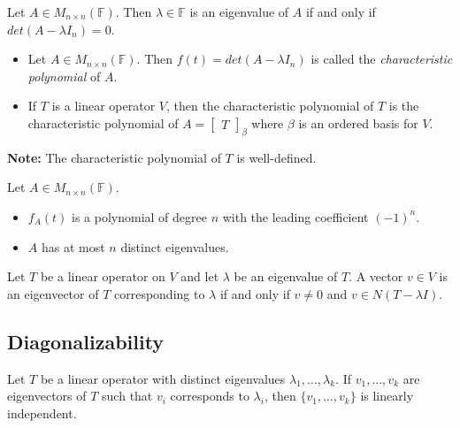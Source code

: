 \documentclass[12pt]{article}
\newenvironment{theorem}[2][Theorem]{\begin{trivlist}
\item[\hskip \labelsep {\bfseries #1}\hskip \labelsep {\bfseries #2.}]}{\end{trivlist}}
\newenvironment{definition}[2][Definition]{\begin{trivlist}
\item[\hskip \labelsep {\bfseries #1}\hskip \labelsep {\bfseries #2}]}{\end{trivlist}}
\begin{document}
\begin{theorem}{5.2}
Let $A \in M_{n \times n}(\mathbb{F})$. Then $\lambda \in \mathbb{F}$ is an eigenvalue of $A$ if and only if $det(A - \lambda I_n) = 0$.
\end{theorem}

\begin{definition}{3} \text{ }
\begin{itemize}
    \item Let $A \in M_{n \times n}(\mathbb{F})$. Then $f(t) = det(A - \lambda I_n)$ is called the \textit{characteristic polynomial} of $A$.
    
    \item If $T$ is a linear operator $V$, then the characteristic polynomial of $T$ is the characteristic polynomial of $A = \begin{bmatrix} T \end{bmatrix}_\beta$ where $\beta$ is an ordered basis for $V$.
\end{itemize}
\end{definition}

\noindent\textbf{Note:} The characteristic polynomial of $T$ is well-defined.

\begin{theorem}{5.3}
Let $A \in M_{n \times n}(\mathbb{F})$.

\begin{itemize}
    \item $f_A(t)$ is a polynomial of degree $n$ with the leading coefficient $(-1)^n$.
    
    \item $A$ has at most $n$ distinct eigenvalues.
\end{itemize}
\end{theorem}

\begin{theorem}{5.4}
Let $T$ be a linear operator on $V$ and let $\lambda$ be an eigenvalue of $T$. A vector $v \in V$ is an eigenvector of $T$ corresponding to $\lambda$ if and only if $v \neq 0$ and $v \in N(T - \lambda I)$.
\end{theorem}

\subsection{Diagonalizability}

\begin{theorem}{5.5}
Let $T$ be a linear operator with distinct eigenvalues $\lambda_1, \dots, \lambda_k$. If $v_1, \dots, v_k$ are eigenvectors of $T$ such that $v_i$ corresponds to $\lambda_i$, then $\{v_1, \dots, v_k\}$ is linearly independent. 
\end{theorem}
\end{document}
